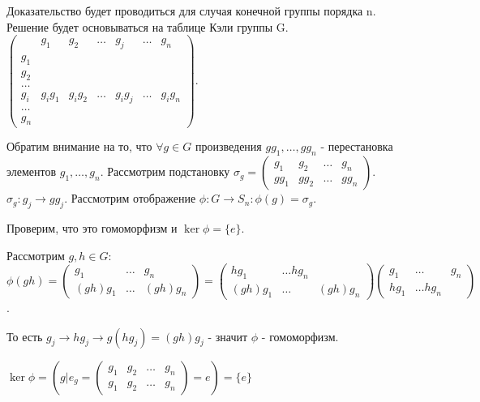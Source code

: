 \begin{theorem}
	Доказательство будет проводиться для случая конечной группы порядка n. Решение будет основываться на таблице Кэли группы G. \newline
	\(\begin{pmatrix}
		 & g_1 & g_2 & \ldots &g_j &\ldots & g_n \\
		 g_1 & \\
		 g_2 & \\
		 \ldots \\
		 g_i & g_ig_1 & g_ig_2 & \ldots & g_ig_j & \ldots & g_ig_n\\
		 \ldots \\
		 g_n
	\end{pmatrix}\). 
	
	Обратим внимание на то, что \(\forall g\in G\) произведения \(gg_1, \ldots, gg_n\) - перестановка элементов \(g_1, \ldots, g_n\). Рассмотрим подстановку \(\sigma_g = \begin{pmatrix}
	g_1 & g_2 & \ldots & g_n \\
	gg_1 & gg_2 & \ldots & gg_n
\end{pmatrix}\). \(\sigma_g:g_j\to gg_j\). Рассмотрим отображение \(\phi: G\to S_n: \phi(g) = \sigma_g\). 

Проверим, что это гомоморфизм и \(\ker\phi = \{e\}\). 

Рассмотрим \(g,h\in G:\) \[ \phi(gh) = \begin{pmatrix}
g_1 & \ldots & g_n \\
(gh)g_1 & \ldots & (gh)g_n
\end{pmatrix}=\begin{pmatrix}
hg_1 & \ldots hg_n \\
(gh)g_1 & \ldots & (gh)g_n
\end{pmatrix}\begin{pmatrix}
g_1 & \ldots & g_n \\
hg_1 & \ldots hg_n
\end{pmatrix}\].

То есть \(g_j \to hg_j\to g(hg_j) = (gh)g_j\) - значит $\phi$ - гомоморфизм.

\(\ker\phi = \left(g|e_g = \begin{pmatrix}
g_1 & g_2 & \ldots & g_n \\
g_1 & g_2 & \ldots & g_n
\end{pmatrix} = e\right) = \{e\}\)
\end{theorem}
